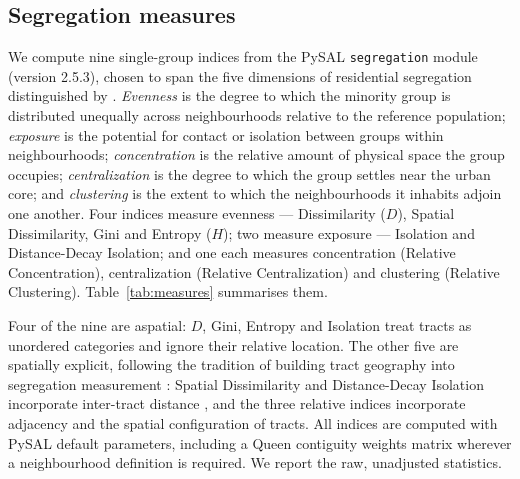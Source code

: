 \documentclass[pdflatex,sn-basic]{sn-jnl}%
\begin{document}


\subsection{Segregation measures}\label{subsec:measures}

We compute nine single-group indices from the PySAL \texttt{segregation} module (version 2.5.3), chosen to span the five dimensions of residential segregation distinguished by \citet{massey1988dimensions}. \emph{Evenness} is the degree to which the minority group is distributed unequally across neighbourhoods relative to the reference population; \emph{exposure} is the potential for contact or isolation between groups within neighbourhoods; \emph{concentration} is the relative amount of physical space the group occupies; \emph{centralization} is the degree to which the group settles near the urban core; and \emph{clustering} is the extent to which the neighbourhoods it inhabits adjoin one another. Four indices measure evenness --- Dissimilarity ($D$), Spatial Dissimilarity, Gini and Entropy ($H$); two measure exposure --- Isolation and Distance-Decay Isolation; and one each measures concentration (Relative Concentration), centralization (Relative Centralization) and clustering (Relative Clustering). Table~\ref{tab:measures} summarises them.

Four of the nine are aspatial: $D$, Gini, Entropy and Isolation treat tracts as unordered categories and ignore their relative location. The other five are spatially explicit, following the tradition of building tract geography into segregation measurement \citep{rey2004spatial}: Spatial Dissimilarity and Distance-Decay Isolation incorporate inter-tract distance \citep{wong1993spatial, morgan1983distance}, and the three relative indices incorporate adjacency and the spatial configuration of tracts. All indices are computed with PySAL default parameters, including a Queen contiguity weights matrix wherever a neighbourhood definition is required. We report the raw, unadjusted statistics.
\end{document}
